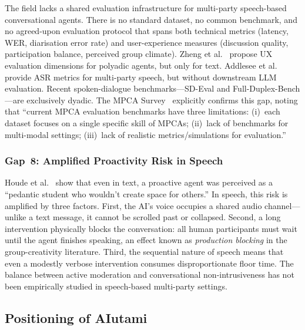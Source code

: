 The field lacks a shared evaluation infrastructure for multi-party speech-based
conversational agents.  There is no standard dataset, no common benchmark, and
no agreed-upon evaluation protocol that spans both technical metrics (latency,
WER, diarisation error rate) and user-experience measures (discussion quality,
participation balance, perceived group climate).  Zheng et
al.~\cite{zheng2022polyadic} propose UX evaluation dimensions for polyadic
agents, but only for text.  Addlesee et al.~\cite{addlesee2020asr} provide ASR
metrics for multi-party speech, but without downstream LLM evaluation.  Recent
spoken-dialogue benchmarks---SD-Eval and Full-Duplex-Bench---are exclusively
dyadic.  The MPCA Survey~\cite{mpcasurvey2025} explicitly confirms this gap,
noting that ``current MPCA evaluation benchmarks have three limitations:
(i)~each dataset focuses on a single specific skill of MPCAs; (ii)~lack of
benchmarks for multi-modal settings; (iii)~lack of realistic
metrics/simulations for evaluation.''

\subsubsection{Gap~8: Amplified Proactivity Risk in Speech}
\label{sssec:gap8}

Houde et al.~\cite{houde2025koala} show that even in text, a proactive agent
was perceived as a ``pedantic student who wouldn't create space for others.''
In speech, this risk is amplified by three factors.  First, the AI's voice
occupies a shared audio channel---unlike a text message, it cannot be scrolled
past or collapsed.  Second, a long intervention physically blocks the
conversation: all human participants must wait until the agent finishes
speaking, an effect known as \emph{production blocking} in the group-creativity
literature.  Third, the sequential nature of speech means that even a modestly
verbose intervention consumes disproportionate floor time.  The balance between
active moderation and conversational non-intrusiveness has not been empirically
studied in speech-based multi-party settings.


\subsection{Positioning of AIutami}
\label{subsec:positioning}

